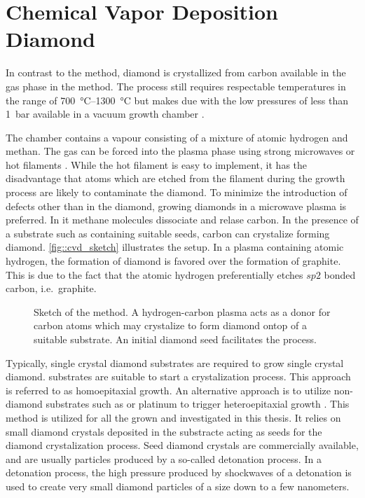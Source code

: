 \section[CVD]{Chemical Vapor Deposition Diamond}\label{sec::cvd}




	In contrast to the \HPHT method, diamond is crystallized from carbon available in the gas phase in the \CVD method.
	The process still requires respectable temperatures in the range of \SIrange{700}{1300}{\celsius} but makes due with the low pressures of less than \SI{1}{\bar} available in a vacuum growth chamber \cite{janine::141}.

	The chamber contains a vapour consisting of a mixture of atomic hydrogen and methan. The gas can be forced into the plasma phase using strong microwaves or hot filaments \cite{neu::75, neu::78, neu::79}. While the hot filament is easy to implement, it has the disadvantage that atoms which are etched from the filament during the growth process are likely to contaminate the diamond. To minimize the introduction of defects other than \sivs in the diamond, growing diamonds in a microwave plasma is preferred. In it methane molecules dissociate and relase carbon. In the presence of a substrate such as \ir containing suitable seeds, carbon can crystalize forming diamond. \autoref{fig::cvd_sketch} illustrates the setup. In a plasma containing atomic hydrogen, the formation of diamond is favored over the formation of graphite. This is due to the fact that the atomic hydrogen preferentially etches $sp2$ bonded carbon, i.e.\ graphite.

	\begin{figure}[htp]
		\centering
		\caption[\CVD production method]{Sketch of the \CVD method. A hydrogen-carbon plasma acts as a donor for carbon atoms which may crystalize to form diamond ontop of a suitable \ir substrate. An initial diamond seed facilitates the process.}
		\label{fig::cvd_sketch}
	\end{figure}

	Typically, single crystal diamond substrates are required to grow single crystal diamond. \HPHT substrates are suitable to start a crystalization process. This approach is referred to as homoepitaxial growth. An alternative approach is to utilize non-diamond substrates such as \ir or platinum to trigger heteroepitaxial growth \cite{janine::142, neu::143}.
	This method is utilized for all the \CVD \nds grown and investigated in this thesis.
	It relies on small diamond crystals deposited in the substracte acting as seeds for the diamond crystalization process. Seed diamond crystals are commercially available, and are usually particles produced by a so-called detonation process.
	In a detonation process, the high pressure produced by shockwaves of a detonation is used to create very small diamond particles of a size down to a few nanometers.

